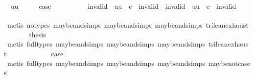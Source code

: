\begin{isabellebody}
\isamarkupfalse%
\ {\isacharparenleft}{}\ uu{\isacharparenright}\isanewline
\ \ \isamarkupfalse%
\ \isamarkupfalse%
\ {\isacharquery}case\isanewline
\ \ \isamarkupfalse%
\ {\isacharminus}\isanewline
\ \ \ \ \isamarkupfalse%
\ {\isachardoublequoteopen}invalid\ {\isasymand}\isactrlsub {\isacharquery}\ {\isacharparenleft}uu\ {\isasymand}\isactrlsub {\isacharquery}\ c{\isacharparenright}\ {\isasymnoteq}\ invalid\ {\isasymlongrightarrow}\ invalid\ {\isasymand}\isactrlsub {\isacharquery}\ {\isacharparenleft}uu\ {\isasymand}\isactrlsub {\isacharquery}\ c{\isacharparenright}\ {\isacharequal}\ invalid{\isachardoublequoteclose}\isanewline
\ \ \ \ \ \ \isamarkupfalse%
\ {\isacharparenleft}metis\ {\isacharparenleft}no{\isacharunderscore}types{\isacharparenright}\ maybe{\isacharunderscore}and{\isachardot}simps{\isacharparenleft}{}{\isacharparenright}\ maybe{\isacharunderscore}and{\isachardot}simps{\isacharparenleft}{}{\isacharparenright}\ maybe{\isacharunderscore}and{\isachardot}simps{\isacharparenleft}{}{\isacharparenright}\ trilean{\isachardot}exhaust{\isacharparenright}\isanewline
\ \ \ \ \isamarkupfalse%
\ \isamarkupfalse%
\ {\isacharquery}thesis\isanewline
\ \ \ \ \ \ \isamarkupfalse%
\ {\isacharparenleft}metis\ {\isacharparenleft}full{\isacharunderscore}types{\isacharparenright}\ maybe{\isacharunderscore}and{\isachardot}simps{\isacharparenleft}{}{\isacharparenright}\ maybe{\isacharunderscore}and{\isachardot}simps{\isacharparenleft}{}{\isacharparenright}\ maybe{\isacharunderscore}and{\isachardot}simps{\isacharparenleft}{}{\isacharparenright}\ trilean{\isachardot}exhaust{\isacharparenright}\isanewline
\ \ \isamarkupfalse%
\isanewline
{}\isamarkupfalse%
\isanewline
\ \ \isamarkupfalse%
\ {\isachardoublequoteopen}{}{\isacharunderscore}{}{\isachardoublequoteclose}\isanewline
\ \ \isamarkupfalse%
\ \isamarkupfalse%
\ {\isacharquery}case\isanewline
\ \ \ \ \isamarkupfalse%
\ {\isacharparenleft}metis\ {\isacharparenleft}full{\isacharunderscore}types{\isacharparenright}\ maybe{\isacharunderscore}and{\isachardot}simps{\isacharparenleft}{}{\isacharparenright}\ maybe{\isacharunderscore}and{\isachardot}simps{\isacharparenleft}{}{\isacharparenright}\ maybe{\isacharunderscore}and{\isachardot}simps{\isacharparenleft}{}{\isacharparenright}\ maybe{\isacharunderscore}not{\isachardot}cases{\isacharparenright}\isanewline

\end{isabellebody}

